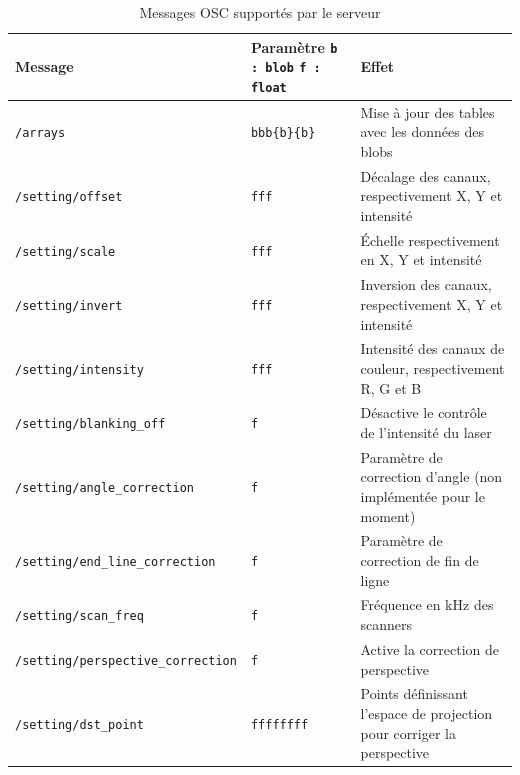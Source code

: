 \begin{fr}
\begin{table}
\begin{bigcenter}
	\begin{tabular}{|l|p{2cm}|p{}|}
\hline 
\textbf{Message} & \textbf{Paramètre} \texttt{b : blob} \texttt{f : float} & \textbf{Effet} \\
\hline 
\texttt{/arrays} & \texttt{bbb\{b\}\{b\}} & Mise à jour des tables avec les données des blobs \\ 
\hline 
\texttt{/setting/offset} & \texttt{fff} & Décalage des canaux, respectivement X, Y et intensité \\ 
\hline 
\texttt{/setting/scale} & \texttt{fff} & Échelle respectivement en X, Y et intensité \\ 
\hline 
\texttt{/setting/invert} & \texttt{fff} & Inversion des canaux, respectivement X, Y et intensité \\ 
\hline 
\texttt{/setting/intensity} & \texttt{fff} & Intensité des canaux de couleur, respectivement R, G et B \\  
\hline
\texttt{/setting/blanking\_off} & \texttt{f} & Désactive le contrôle de l'intensité du laser \\
\hline
\texttt{/setting/angle\_correction} & \texttt{f} & Paramètre de correction d'angle (non implémentée pour le moment) \\
\hline
\texttt{/setting/end\_line\_correction} & \texttt{f} & Paramètre de correction de fin de ligne \\
\hline
\texttt{/setting/scan\_freq} & \texttt{f} & Fréquence en kHz des scanners \\
\hline
\texttt{/setting/perspective\_correction} & \texttt{f} & Active la correction de perspective \\
\hline
\texttt{/setting/dst\_point} & \texttt{ffffffff} & Points définissant l'espace de projection pour corriger la perspective \\
\hline
	\end{tabular}
	\end{bigcenter}
	\caption{\label{tab:message_osc} Messages OSC supportés par le serveur}
\end{table}
\end{fr}

